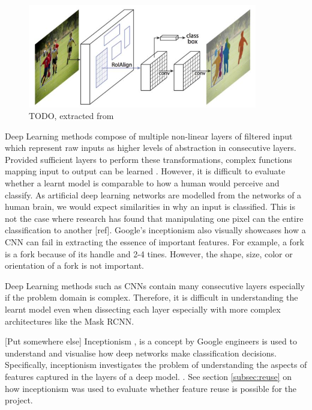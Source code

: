 \begin{figure}[H]
	\begin{center}
		\includegraphics[width=100mm, scale=1]{maskrcnn.JPG}
		\caption{TODO, extracted from \cite{mordvintsev2015inceptionism}}
		\label{fig:cnn}
	\end{center}
\end{figure}
Deep Learning methods compose of multiple non-linear layers of filtered input which represent raw inputs as higher levels of abstraction in consecutive layers. Provided sufficient layers to perform these transformations, complex functions mapping input to output can be learned \cite{lecun2015deep}.
However, it is difficult to evaluate whether a learnt model is comparable to how a human would perceive and classify. As artificial deep learning networks are modelled from the networks of a human brain, we would expect similarities in why an input is classified. This is not the case where research has found that manipulating one pixel can the entire classification to another [ref]. Google's inceptionism also visually showcases how a CNN can fail in extracting the essence of important features. For example, a fork is a fork because of its handle and 2-4 tines. However, the shape, size, color or orientation of a fork is not important. 

Deep Learning methods such as CNNs contain many consecutive layers especially if the problem domain is complex. Therefore, it is difficult in understanding the learnt model even when dissecting each layer especially with more complex architectures like the Mask RCNN. 

[Put somewhere else]
Inceptionism \cite{szegedy2015going}, is a concept by Google engineers is used to understand and visualise how deep networks make classification decisions. Specifically, inceptionism investigates the problem of understanding the aspects of features captured in the layers of a deep model.
 \cite{mordvintsev2015inceptionism}. See section \ref{subsec:reuse} on how inceptionism was used to evaluate whether feature reuse is possible for the project.


